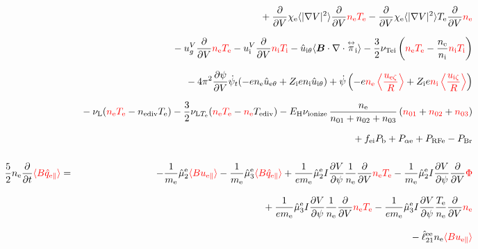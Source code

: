 \documentclass[11pt]{article}
\def\bvec#1{\leavevmode\hbox{\boldmath$#1$}}
\let\vec=\bvec
\def\r#1{{\rm#1}}
\def\ave#1{\left\langle#1\right\rangle}
\def\aves#1{\langle#1\rangle}
\def\dd#1#2{\frac{\partial #1}{\partial #2}}
\def\tensor#1{\mathord{\displaystyle\mathop{#1}^\leftrightarrow}}
\def\para{\parallel}
\def\ddV{\frac{\partial}{\partial V}}
\def\psid{\dot{\psi}}
\def\psit{\psi_t}
\def\psitd{\dot{\psit}}
\def\me{m_\r{e}}
\def\mb{m_\r{b}}
\def\nee{n_\r{e}}
\def\ni{n_\r{i}}
\def\nb{n_\r{b}}
\def\nna{n_{01}}
\def\nnb{n_{02}}
\def\nnc{n_{03}}
\def\Te{T_\r{e}}
\def\Ti{T_\r{i}}
\def\Pb{P_\r{b}}
\def\Eb{E_\r{b}}
\def\uepara{u_{\r{e}\para}}
\def\ubpara{u_{\r{b}\para}}
\def\qepara{q_{\r{e}\para}}
\def\qhatepara{\hat{q}_{\r{e}\para}}
\def\uiV{u_\r{i}^V}
\def\ugV{u_{g}^V}
\def\chie{\chi_\r{e}}
\def\ddt{\frac{\partial}{\partial t}}
\def\PRFe{P_\r{RFe}}
\def\PBr{P_\r{Br}}
\def\EH{E_\r{H}}
\def\fei{f_\r{ei}}
\def\Palpe{P_{\alpha\r{e}}}
\def\nuL{\nu_\r{L}}
\def\nuion{\nu_\r{ionize}}
\def\nediv{n_\r{ediv}}
\def\Tediv{T_\r{ediv}}
\def\nuLTe{\nu_{\r{L}T_\r{e}}}
\def\red#1{\textcolor{red}{#1}}
\begin{document}
\begin{eqnarray}
\nonumber\\[2.5mm]&&{}
%
  + \ddV \chie \aves{|\nabla V|^2}\ddV \red{\nee \Te}
  - \ddV \chie \aves{|\nabla V|^2}\Te \ddV \red{\nee}
\nonumber\\[2.5mm]&&{}
%
  - \ugV \ddV \red{\nee \Te}
%
  - \uiV \ddV \red{\ni  \Ti}
%
  - \hat{u}_{\r{i}\theta} \aves{\vec{B}\cdot\nabla\cdot\tensor{\pi}_\r{i}}
%
  - \frac{3}{2} \nu_\r{Tei} \left(\red{\nee \Te} - \frac{\nee}{\ni} \red{\ni \Ti}\right)
\nonumber\\[2.5mm]&&{}
%
%
%
  - 4\pi^2 \dd{\psi}{V} \dot{\psi}_t (-e \nee \hat{u}_{\r{e}\theta} + Z_\r{i} e \ni \hat{u}_{\r{i}\theta})
%
%
  +\dot{\psi}\left(-e \red{\nee \ave{\frac{u_{\r{e}\zeta}}{R}}} + Z_\r{i} e \red{\ni
  \ave{\frac{u_{\r{i}\zeta}}{R}}}\right)
\nonumber\\[2.5mm]&&{}
%
  - \nuL (\red{\nee\Te} - \nediv\Te)
%
  - \frac{3}{2} \nuLTe (\red{\nee\Te} - \red{\nee}\Tediv)
%
  - \EH \nuion\, \frac{\nee}{\nna + \nnb + \nnc}\, (\red{\nna} + \red{\nnb} + \red{\nnc})
\nonumber\\[2.5mm]&&{}
%
  + \fei \Pb
%
%
  + \Palpe
%
  + \PRFe
%
  - \PBr
\\[5mm]
 \frac{5}{2} \nee \ddt \red{\aves{B \qhatepara}} &=&
%
  - \frac{1}{\me} \hat{\mu}_2^\r{e} \red{\aves{B \uepara}}
  - \frac{1}{\me} \hat{\mu}_3^\r{e} \red{\aves{B \qhatepara}}
%
  + \frac{1}{e\me} \hat{\mu}_2^\r{e} I \dd{V}{\psi} \frac{1}{\nee} \ddV
  \red{\nee \Te}
  - \frac{1}{\me} \hat{\mu}_2^\r{e} I \dd{V}{\psi} \ddV \red{\Phi}
\nonumber\\[3mm]&&{}
%
  + \frac{1}{e\me} \hat{\mu}_3^\r{e} I \dd{V}{\psi} \frac{1}{\nee} \ddV
  \red{\nee \Te}
  - \frac{1}{e\me} \hat{\mu}_3^\r{e} I \dd{V}{\psi} \frac{\Te}{\nee} \ddV
  \red{\nee}
\nonumber\\[3mm]&&{}
%
  - \hat{\ell}_{21}^{\r{ee}} \nee \red{\aves{B \uepara}}

\end{eqnarray}
\end{document}
